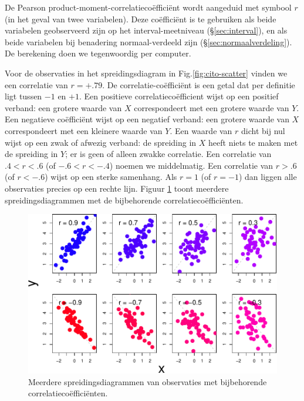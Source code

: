 \documentclass[
]{book}
\begin{document}
De Pearson product-moment-correlatiecoëfficiënt wordt aangeduid met
symbool \(r\) (in het geval van twee variabelen). Deze coëfficiënt is te
gebruiken als beide variabelen geobserveerd zijn op het
interval-meetniveau
(§\ref{sec:interval}), en als beide variabelen bij benadering
normaal-verdeeld zijn
(§\ref{sec:normaalverdeling}). De berekening doen we tegenwoordig
per computer.

Voor de observaties in het spreidingsdiagram in
Fig.\ref{fig:cito-scatter} vinden we een correlatie van \(r=+.79\). De
correlatie-coëfficiënt is een getal dat per definitie ligt tussen \(-1\)
en \(+1\). Een positieve correlatiecoëfficient wijst op een positief
verband: een grotere waarde van \(X\) correspondeert met een grotere
waarde van \(Y\). Een negatieve coëfficiënt wijst op een negatief verband:
een grotere waarde van \(X\) correspondeert met een kleinere waarde van
\(Y\). Een waarde van \(r\) dicht bij nul wijst op een zwak of afwezig
verband: de spreiding in \(X\) heeft niets te maken met de spreiding in
\(Y\); er is geen of alleen zwakke correlatie. Een correlatie van
\(.4<r<.6\) (of \(-.6 < r < -.4\)) noemen we middelmatig. Een correlatie van
\(r>.6\) (of \(r< -.6\)) wijst op een sterke samenhang. Als \(r=1\) (of
\(r=-1\)) dan liggen alle observaties precies op een rechte lijn.
Figuur \ref{fig:cor-scatter} toont meerdere spreidingsdiagrammen met de
bijbehorende correlatiecoëfficiënten.

\begin{figure}

{\centering \includegraphics{KMS-NL_files/figure-latex/cor-scatter-1} 

}

\caption{Meerdere spreidingsdiagrammen van observaties met bijbehorende correlatiecoëfficiënten.}\label{fig:cor-scatter}
\end{figure}
\end{document}
